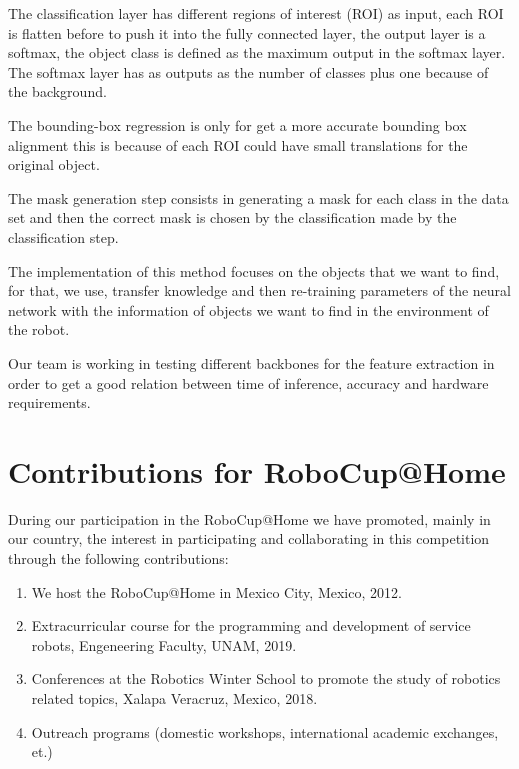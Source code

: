 \documentclass{llncs}
\begin{document}
The classification layer has different regions of interest (ROI) as input, each ROI is flatten before to push it into the fully connected layer, the output layer is a softmax, the object class is defined as the maximum output in the softmax layer. The softmax layer has as outputs as the number of classes plus one because of the background.

The bounding-box regression is only for get a more accurate bounding box alignment this is because of each ROI could have small translations for the original object.


The mask generation step consists in generating a mask for each class in the data set and then the correct mask is chosen by the classification made by the classification step.

The implementation of this method focuses on the objects that we want to find, for that, we use, transfer knowledge and then re-training parameters of the neural network with the information of objects we want to find in the environment of the robot.

Our team is working in testing different backbones for the feature extraction in order to get a good relation between time of inference, accuracy and hardware requirements.




\section{Contributions for RoboCup@Home}\label{sec:contributions}
During our participation in the RoboCup@Home we have promoted, mainly in our country, 
the interest in participating and collaborating in this competition through the following contributions:

\begin{enumerate}
	\item We host the RoboCup@Home in Mexico City, Mexico, 2012.\\
	\item Extracurricular course for the programming and development of service robots, Engeneering Faculty, UNAM, 2019.\\
	\item Conferences at the Robotics Winter School to promote the study of robotics related topics, Xalapa Veracruz, Mexico, 2018.\\
	\item Outreach programs (domestic workshops, international academic exchanges, et.) 
\end{enumerate}
\end{document}
